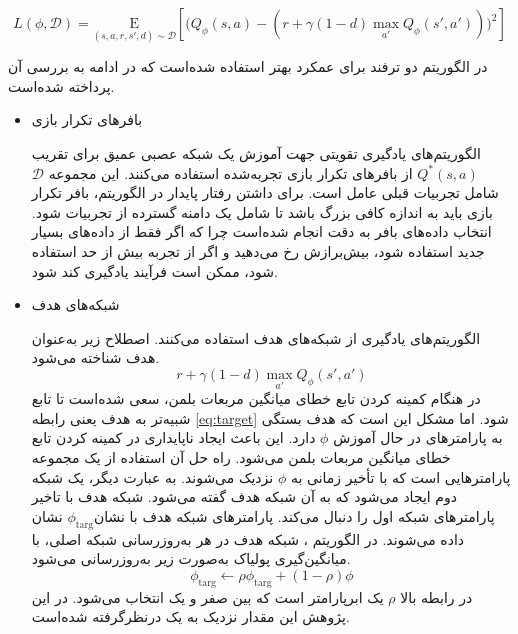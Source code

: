           \begin{equation}
          	L(\phi, {\mathcal D}) = \underset{(s,a,r,s',d) \sim {\mathcal D}}{{\mathrm E}}\left[
          	\Bigg( Q_{\phi}(s,a) - \left(r + \gamma (1 - d) \max_{a'} Q_{\phi}(s',a') \right) \Bigg)^2
          	\right]
          \end{equation}
          
          
          
          
          در الگوریتم  دو ترفند برای عمکرد بهتر استفاده شده‌است که در ادامه به بررسی آن پرداخته شده‌است.
          \begin{itemize}
          	\item بافرهای تکرار بازی
          	
          	 الگوریتم‌های یادگیری تقویتی جهت آموزش یک شبکه عصبی عمیق برای تقریب 
          	 $Q^*(s,a)$
          	  از  بافرهای تکرار بازی
          	   تجربه‌شده استفاده می‌کنند. 
          	           این مجموعه 
          	   ${\mathcal D}$
          	   شامل تجربیات قبلی عامل است. برای داشتن رفتار پایدار در الگوریتم، بافر تکرار بازی باید به اندازه کافی بزرگ باشد تا شامل یک دامنه گسترده از تجربیات شود. انتخاب داده‌های بافر به دقت انجام شده‌است چرا که اگر فقط از داده‌های بسیار جدید استفاده شود، بیش‌برازش
          	   رخ می‌دهید و اگر از تجربه بیش از حد استفاده شود، ممکن است فرآیند یادگیری کند شود.
          	\item شبکه‌های هدف
          	
          	الگوریتم‌های یادگیری  از شبکه‌های هدف استفاده می‌کنند. اصطلاح زیر به‌عنوان هدف شناخته می‌شود.
          	\begin{equation}\label{eq:target}
          		r + \gamma (1 - d) \max_{a'} Q_{\phi}(s',a')
          	\end{equation}
          	در هنگام کمینه کردن تابع خطای میانگین مربعات بلمن، سعی شده‌است تا تابع  شبیه‌تر به هدف یعنی رابطه \eqref{eq:target} شود. اما مشکل این است که هدف بستگی به پارامترهای در حال آموزش $\phi$ دارد.
 این باعث ایجاد ناپایداری در کمینه کردن تابع خطای میانگین مربعات بلمن می‌شود. راه حل آن استفاده از یک مجموعه پارامترهایی است که با تأخیر زمانی به 
          	$\phi$
          	 نزدیک می‌شوند. به عبارت دیگر، یک شبکه دوم  ایجاد می‌شود که به آن شبکه هدف گفته می‌شود. شبکه هدف 
          	 با تاخیر پارامترهای شبکه اول را دنبال می‌کند. پارامترهای شبکه هدف با نشان 
          	​$\phi_{\text{targ}}$
          	نشان داده می‌شوند.
          	در الگوریتم ، شبکه هدف در هر به‌روزرسانی شبکه اصلی، با میانگین‌گیری پولیاک
       به‌صورت زیر به‌روزرسانی می‌شود.
          	 \begin{equation}
          	 	\phi_{\text{targ}} \leftarrow \rho \phi_{\text{targ}} + (1 - \rho) \phi
          	 \end{equation}
          	 در رابطه بالا $\rho$ یک ابرپارامتر است که بین صفر و یک انتخاب می‌شود. در این پژوهش این مقدار نزدیک به یک درنظرگرفته شده‌است.
          \end{itemize}
          
